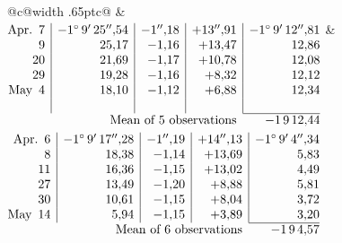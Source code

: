 \noindent\begin{tabular}{@{}c@{\hspace{.4em}\vrule width .65pt\hspace{.4em}}c@{}}
 &
 \\[.18ex]
\(\begin{array}[t]{@{}r|r|r|r|r@{}}
\text{Apr.}\enspace 7 & -1^\circ\,9'\,25''{,}54 & -1''{,}18 & +13''{,}91 & -1^\circ\,9'\,12''{,}81\\
9 & 25{,}17 & -1{,}16 & +13{,}47 & 12{,}86\\
20 & 21{,}69 & -1{,}17 & +10{,}78 & 12{,}08\\
29 & 19{,}28 & -1{,}16 & +8{,}32 & 12{,}12\\
\text{May}\enspace 4 & 18{,}10 & -1{,}12 & +6{,}88 & 12{,}34\\
 & & & & \\
\cline{5-5}
\multicolumn{4}{r}{\text{Mean of 5 observations}} & -1\,9\,12{,}44
\end{array}\)
&
\(\begin{array}[t]{@{}r|r|r|r|r@{}}
\text{Apr.}\enspace 6 & -1^\circ\,9'\,17''{,}28 & -1''{,}19 & +14''{,}13 & -1^\circ\,9'\,4''{,}34\\
8 & 18{,}38 & -1{,}14 & +13{,}69 & 5{,}83\\
11 & 16{,}36 & -1{,}15 & +13{,}02 & 4{,}49\\
27 & 13{,}49 & -1{,}20 & +8{,}88 & 5{,}81\\
30 & 10{,}61 & -1{,}15 & +8{,}04 & 3{,}72\\
\text{May}\enspace 14 & 5{,}94 & -1{,}15 & +3{,}89 & 3{,}20\\
\cline{5-5}
\multicolumn{4}{r}{\text{Mean of 6 observations}} & -1\,9\,4{,}57
\end{array}\)
\end{tabular}\par\medskip
